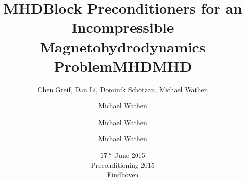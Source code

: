\documentclass[handout]{beamer}
\title{MHD}
\author[]{Chen Greif, Dan Li, Dominik Sch\"{o}tzau, \underline{Michael Wathen}}
\institute[]{\Big{Eindhoven precond}}
\date[]{$17^{\tiny{\mbox{th}}}$ June 2015 \\ Preconditioning 2015 \\ Eindhoven}
\begin{document}
\begin{frame}

\title{Block Preconditioners for an Incompressible Magnetohydrodynamics Problem}
\titlepage
\author{Michael Wathen}

\author{Michael Wathen}

\title{MHD}
\author{Michael Wathen}

\end{frame}
\title{MHD}






\end{document}
